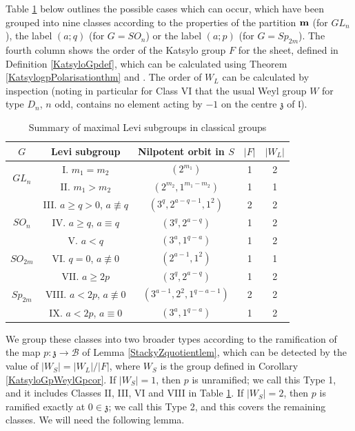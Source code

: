 \documentclass{amsart}
\theoremstyle{remark}
\numberwithin{theorem}{section}
\numberwithin{equation}{section}
\begin{document}
Table \ref{Levistbl} below outlines the possible cases which can occur, which have been grouped into nine classes according to the properties of the partition ${\bf m}$ (for $GL_n$), the label $(a;q)$ (for $G=SO_n$) or the label $(a;p)$ (for $G=Sp_{2m}$). The fourth column shows the order of the Katsylo group $F$ for the sheet, defined in Definition \ref{KatsyloGpdef}, which can be calculated using Theorem \ref{KatsylogpPolarisationthm} and \cite{Hesselink}. The order of $W_L$ can be calculated by inspection (noting in particular for Class VI that the usual Weyl group $W$ for type $D_n$, $n$ odd, contains no element acting by $-1$ on the centre $\mathfrak{z}$ of $\mathfrak{l}$).

\begin{table}[ht]
\centering
\caption{Summary of maximal Levi subgroups in classical groups}
\begin{tabular}{|c|c|c|c|c|}
\hline
$G$ & Levi subgroup & Nilpotent orbit in $S$ & $|F|$ & $|W_L|$ \\
\hline
\multirow{2}{*}{$GL_n$} & I. $m_1=m_2$ & $(2^{m_1})$ & 1 & 2 \\
& II. $m_1 > m_2$ & $(2^{m_2},1^{m_1-m_2})$ & 1 & 1 \\
\hline
\multirow{3}{*}{$SO_n$} & III. $a \geq q>0$, $a \not \equiv q$ & $(3^q, 2^{a-q-1},1^2)$ & 2 & 2 \\
&IV. $a \geq q$, $a \equiv q$& $(3^{q},2^{a-q})$ & 1 & 2 \\
& V. $a < q$ & $(3^a,1^{q-a}) $& 1 & 2\\
\hline
$SO_{2m}$&VI. $q = 0$, $a \not \equiv 0$& $(2^{a-1},1^2)$ & 1 & 1 \\
\hline
\multirow{3}{*}{$Sp_{2m}$} &VII. $a \geq 2p$ & $(3^{q},2^{a-q})$  & 1 & 2\\
&VIII. $a < 2p$, $a \not \equiv 0$ & $(3^{a-1},2^2,1^{q-a-1})$ & 2 & 2 \\
&IX. $a < 2p$, $a \equiv 0$ & $(3^a,1^{q-a})$ & 1 & 2 \\
\hline
\end{tabular}
\label{Levistbl}
\end{table}

We group these classes into two broader types according to the ramification of the map $p:\mathfrak{z} \rightarrow \mathcal B$ of Lemma \ref{StackyZquotientlem}, which can be detected by the value of $|W_S| = |W_L|/|F|$, where $W_S$ is the group defined in Corollary \ref{KatsyloGpWeylGpcor}. If $|W_S| = 1$, then $p$ is unramified; we call this Type 1, and it includes Classes II, III, VI and VIII in Table \ref{Levistbl}. If $|W_S|=2$, then $p$ is ramified exactly at $0 \in \mathfrak{z}$; we call this Type 2, and this covers the remaining classes. We will need the following lemma.
\end{document}
